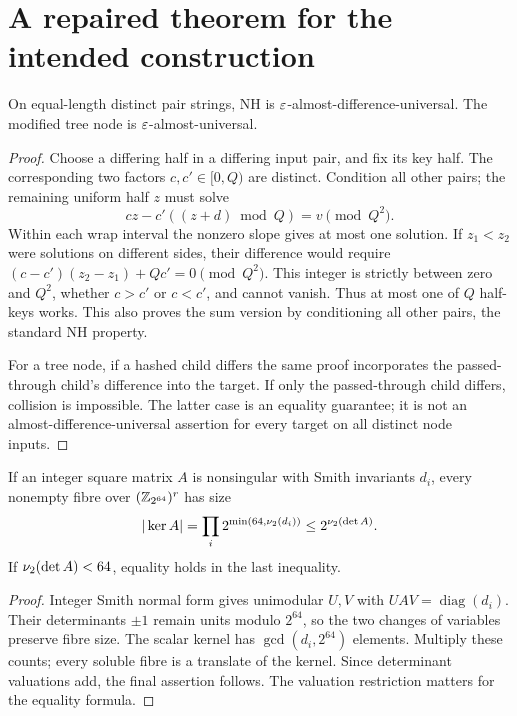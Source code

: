 \section{A repaired theorem for the intended construction}\label{sec:repair}
\begin{lemma}[Integer NH]\label{lem:nh}
On equal-length distinct pair strings, NH is $\varepsilon$-almost-difference-universal. The modified tree node is $\varepsilon$-almost-universal.
\end{lemma}
\begin{proof}
Choose a differing half in a differing input pair, and fix its key half. The corresponding two factors $c,c'\in[0,Q)$ are distinct. Condition all other pairs; the remaining uniform half $z$ must solve
\[
 cz-c'((z+d)\bmod Q)=v\pmod{Q^2}.
\]
Within each wrap interval the nonzero slope gives at most one solution. If $z_1<z_2$ were solutions on different sides, their difference would require
$(c-c')(z_2-z_1)+Qc'=0\pmod{Q^2}$. This integer is strictly between zero and $Q^2$, whether $c>c'$ or $c<c'$, and cannot vanish. Thus at most one of $Q$ half-keys works. This also proves the sum version by conditioning all other pairs, the standard NH property\cite{umac}.

For a tree node, if a hashed child differs the same proof incorporates the passed-through child's difference into the target. If only the passed-through child differs, collision is impossible. The latter case is an equality guarantee; it is not an almost-difference-universal assertion for every target on all distinct node inputs.
\end{proof}

\begin{lemma}\label{lem:matrix}
If an integer square matrix $A$ is nonsingular with Smith invariants $d_i$, every nonempty fibre over $(\mathbb Z_{2^{64}})^r$ has size
\[
 |\ker A|=\prod_i2^{\min(64,\nu_2(d_i))}\le2^{\nu_2(\det A)}.
\]
If $\nu_2(\det A)<64$, equality holds in the last inequality.
\end{lemma}
\begin{proof}
Integer Smith normal form gives unimodular $U,V$ with $UAV=\operatorname{diag}(d_i)$. Their determinants $\pm1$ remain units modulo $2^{64}$, so the two changes of variables preserve fibre size. The scalar kernel has $\gcd(d_i,2^{64})$ elements. Multiply these counts; every soluble fibre is a translate of the kernel. Since determinant valuations add, the final assertion follows. The valuation restriction matters for the equality formula.
\end{proof}

